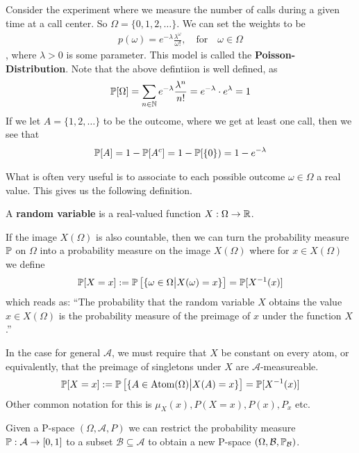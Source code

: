 \begin{ex}
  Consider the experiment where we measure the number of calls during a given time at a call center. So $\Omega = \{0,1,2,\ldots\}$. 
  We can set the weights to be 
  \begin{align*}
    p(\omega) = e^{-\lambda} \frac{\lambda^{\omega}}{\omega!}, \quad \text{for} \quad \omega \in \Omega
  \end{align*}
  , where $\lambda > 0$ is some parameter. This model is called the \textbf{Poisson-Distribution}.
  Note that the above defintiion is well defined, as
  \begin{align*}
    \mathbb{P}[\Omega] = \sum_{n \in \mathbb{N}} e^{-\lambda} \frac{\lambda^{n}}{n!} = e^{- \lambda} \cdot e^{\lambda} = 1
  \end{align*}
  If we let $A = \{1,2, \ldots\}$ to be the outcome, where we get at least one call, then we see that
  \begin{align*}
    \mathbb{P}[A] = 1 - \mathbb{P}[A^{c}] = 1 - \mathbb{P}[\{0\}) = 1 - e^{- \lambda}
  \end{align*}
\end{ex}

What is often very useful is to associate to each possible outcome $\omega \in \Omega$ a real value. This gives us the following definition.

\begin{dfn}
  A \textbf{random variable} is a real-valued function $X: \Omega \to \mathbb{R}$.


  If the image $X(\Omega)$ is also countable, then we can turn the probability measure $\mathbb{P}$ on $\Omega$ into a probability measure on the image $X(\Omega)$ where for $x \in X(\Omega)$ we define
  \begin{align*}
    \mathbb{P}[X = x] := \mathbb{P}\left[\{\omega\in \Omega \big\vert X(\omega) = x\}\right] = \mathbb{P}[X^{-1}(x)]
  \end{align*}
  which reads as: ``The probability that the random variable $X$ obtains the value $x \in X(\Omega)$ is the probability measure of the preimage of $x$ under the function $X$.''

  In the case for general $\mathcal{A}$, we must require that $X$ be constant on every atom, or equivalently, that the preimage of singletons under $X$ are $\mathcal{A}$-measureable. 
  \begin{align*}
    \mathbb{P}[X = x] := \mathbb{P} \left[
      \{A \in \text{Atom}(\Omega) \big\vert X(A) = x\}
    \right]
    = \mathbb{P}[X^{-1}(x)]
  \end{align*}
  Other common notation for this is $\mu_X(x), P(X=x), P(x), P_x$ etc.
\end{dfn}
Given a P-space $(\Omega,\mathcal{A},P)$ we can restrict the probability measure $\mathbb{P}: \mathcal{A} \to [0,1]$ to a subset $\mathcal{B} \subseteq \mathcal{A}$ to obtain a new P-space $(\Omega, \mathcal{B}, \mathbb{P}_{\mathcal{B}})$.

